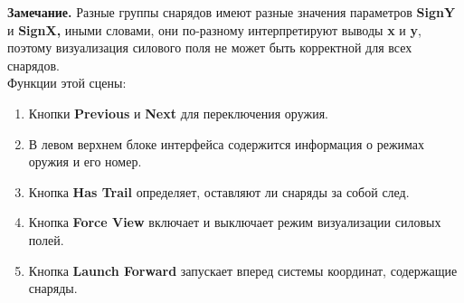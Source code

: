 \textbf{Замечание.} Разные группы снарядов имеют разные значения параметров {\small \textbf{SignY}} и {\small \textbf{SignX,}} иными словами, они по-разному интерпретируют выводы \textbf{x} и \textbf{y}, поэтому визуализация силового поля не может быть корректной для всех снарядов.\\
%
%
Функции этой сцены:
\begin{enumerate}[label=\textbullet]
    \item Кнопки {\small \textbf{Previous}} и {\small \textbf{Next}} для переключения оружия.
    \item В левом верхнем блоке интерфейса содержится информация о режимах оружия и его номер.
    \item Кнопка {\small \textbf{Has Trail}} определяет, оставляют ли снаряды за собой след.
    \item Кнопка {\small \textbf{Force View}} включает и выключает режим визуализации силовых полей.
    \item Кнопка {\small \textbf{Launch Forward}} запускает вперед системы координат, содержащие снаряды.
\end{enumerate}

